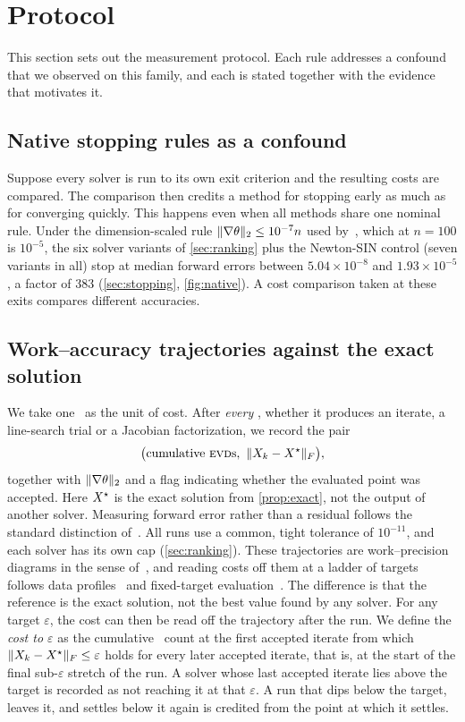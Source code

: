 \section{Protocol}\label{sec:protocol}

This section sets out the measurement protocol. Each rule addresses a
confound that we observed on this family, and each is stated together with the
evidence that motivates it.

\subsection{Native stopping rules as a confound}\label{sec:native}
Suppose every solver is run to its own exit criterion and the resulting costs
are compared. The comparison then credits a method for stopping early as much
as for converging quickly. This happens even when all methods share one
nominal rule. Under the dimension-scaled rule $\lVert \nabla\theta\rVert_2\le10^{-7}n$
used by~\cite{huynh2025accelerated}, which at $n=100$ is $10^{-5}$, the six
solver variants of \cref{sec:ranking} plus the Newton-SIN control (seven
variants in all) stop at median
forward errors between
$5.04\times10^{-8}$ and $1.93\times10^{-5}$, a factor of 383
(\cref{sec:stopping}, \cref{fig:native}). A cost comparison taken at these
exits compares different accuracies.

\subsection{Work--accuracy trajectories against the exact solution}\label{sec:traj}
We take one \EVD\ as the unit of cost. After \emph{every} \EVD, whether it
produces an iterate, a line-search trial or a Jacobian factorization, we record
the pair
\[
  \bigl(\text{cumulative \textsc{evd}s},\ \lVert X_k-X^\star\rVert_F\bigr),
\]
together with $\lVert \nabla\theta\rVert_2$ and a flag indicating whether the
evaluated point was accepted. Here $X^\star$ is the exact solution from
\cref{prop:exact}, not the output of another solver. Measuring forward error
rather than a residual follows the standard distinction
of~\cite[Ch.~1--2]{higham2002accuracy}. All runs use a common,
tight tolerance of $10^{-11}$, and each solver has its own cap (\cref{sec:ranking}). These trajectories are work--precision diagrams in the sense
of~\cite{hairer1996solving}, and reading costs off them at a ladder of targets
follows data profiles~\cite{more2009benchmarking} and fixed-target
evaluation~\cite{hansen2021coco}. The difference is that the reference is the
exact solution, not the best value found by any solver. For any target
$\varepsilon$, the cost can then be read off the trajectory after the run. We
define the \emph{cost to $\varepsilon$} as the cumulative \EVD\ count at the
first accepted iterate from which $\lVert X_k-X^\star\rVert_F\le\varepsilon$ holds for
every later accepted iterate, that is, at the start of the final sub-$\varepsilon$
stretch of the run. A solver whose last accepted iterate lies above the target
is recorded as not reaching it at that $\varepsilon$. A run that dips below the
target, leaves it, and settles below it again is credited from the point at
which it settles.

